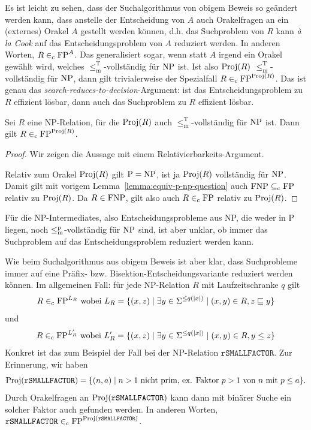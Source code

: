 Es ist leicht zu sehen, dass der Suchalgorithmus von obigem Beweis so geändert werden kann, dass anstelle der Entscheidung von $A$ auch Orakelfragen an ein (externes) Orakel $A$ gestellt werden können, d.h. das Suchproblem von $R$ kann \emph{à la Cook} auf das Entscheidungsproblem von $A$ reduziert werden. In anderen Worten, $R\in_\mathrm{c} \mathrm{FP}^A$. Das generalisiert sogar, wenn statt $A$ irgend ein Orakel gewählt wird, welches $\leq_\mathrm{m}^\mathrm{T}$-vollständig für $\mathrm{NP}$ ist. Ist also $\operatorname{Proj}(R)$ $\leq_\mathrm{m}^\mathrm{T}$-vollständig für $\mathrm{NP}$, dann gilt trivialerweise der Spezialfall $R\in_\mathrm{c} \mathrm{FP}^{\operatorname{Proj}(R)}$. Das ist genau das \emph{search-reduces-to-decision}-Argument: ist das Entscheidungsproblem zu $R$ effizient lösbar, dann auch das Suchproblem zu $R$ effizient lösbar.

\begin{corollary}\label{cor:search-to-decision}
    Sei $R$ eine NP-Relation, für die $\operatorname{Proj}(R)$ auch $\leq_\mathrm{m}^\mathrm{T}$-vollständig für $\mathrm{NP}$ ist.
    Dann gilt $R\in_\mathrm{c} \mathrm{FP}^{\operatorname{Proj}(R)}$.
\end{corollary}
\begin{proof}
    Wir zeigen die Aussage mit einem Relativierbarkeits-Argument.

    Relativ zum Orakel $\operatorname{Proj}(R)$ gilt $\mathrm{P}=\mathrm{NP}$, ist ja $\operatorname{Proj}(R)$ vollständig für $\mathrm{NP}$. Damit gilt mit vorigem Lemma~\ref{lemma:equiv-p-np-question} auch $\mathrm{FNP} \subseteq_\mathrm{c} \mathrm{FP}$ relativ zu $\operatorname{Proj}(R)$.
    Da $R\in \mathrm{FNP}$, gilt also auch $R\in_\mathrm{c} \mathrm{FP}$ relativ zu $\operatorname{Proj}(R)$.
\end{proof}

Für die NP-Intermediates, also Entscheidungsprobleme aus NP, die weder in P liegen, noch $\leq_\mathrm{m}^\mathrm{p}$-vollständig für $\mathrm{NP}$ sind, ist aber unklar, ob immer das Suchproblem auf das Entscheidungsproblem reduziert werden kann.

Wie beim Suchalgorithmus aus obigem Beweis ist aber klar, dass Suchprobleme immer auf eine Präfix- bzw. Bisektion-Entscheidungsvariante reduziert werden können.
Im allgemeinen Fall: für jede NP-Relation $R$ mit Laufzeitschranke $q$ gilt
\[ R \in_\mathrm{c} \mathrm{FP}^{L_R} \text{ wobei } L_R = \{ (x, z) \mid \exists y\in\Sigma^{\leq q(|x|)} \mid (x, y)\in R, z\sqsubseteq y \} \]
und 
\[ R \in_\mathrm{c} \mathrm{FP}^{L'_R} \text{ wobei } L'_R = \{ (x, z) \mid \exists y\in\Sigma^{\leq q(|x|)} \mid (x, y) \in R, y\leq z \} \]
Konkret ist das zum Beispiel der Fall bei der NP-Relation $\mathtt{rSMALLFACTOR}$. Zur Erinnerung, wir haben
\[ \operatorname{Proj}(\mathtt{rSMALLFACTOR}) = \{ (n,a)\mid \text{$n>1$ nicht prim, ex. Faktor $p>1$ von $n$ mit $p\leq a$} \}. \]
Durch Orakelfragen an $\operatorname{Proj}(\mathtt{rSMALLFACTOR})$ kann dann mit binärer Suche ein solcher Faktor auch gefunden werden.
In anderen Worten, $\mathtt{rSMALLFACTOR} \in_\mathrm{c} \mathrm{FP}^{\operatorname{Proj}(\mathtt{rSMALLFACTOR})}$.

